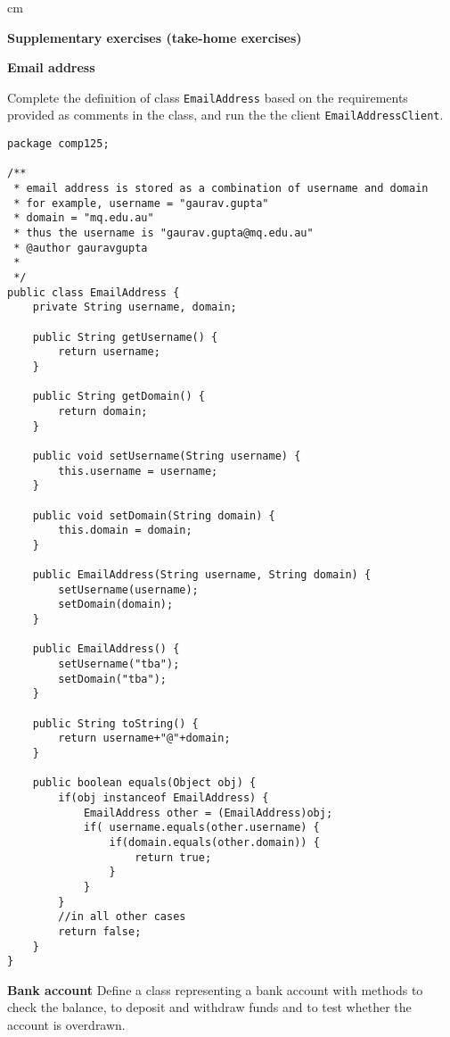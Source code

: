 \noindent\makebox[\linewidth]{\rule{\paperwidth}{0.4pt}}
 cm 

\begin{center}
\large
\textbf{Supplementary exercises (take-home exercises)}
\end{center}
\normalsize

\begin{questions}

\question  \textbf{Email address} \vskip 0.5cm

Complete the definition of class \texttt{EmailAddress} based on the requirements provided as comments in the class, and run the the client \texttt{EmailAddressClient}.

\begin{solution}
\begin{lstlisting}
package comp125;

/**
 * email address is stored as a combination of username and domain
 * for example, username = "gaurav.gupta"
 * domain = "mq.edu.au"
 * thus the username is "gaurav.gupta@mq.edu.au"
 * @author gauravgupta
 *
 */
public class EmailAddress {
	private String username, domain;

	public String getUsername() {
		return username;
	}

	public String getDomain() {
		return domain;
	}

	public void setUsername(String username) {
		this.username = username;
	}

	public void setDomain(String domain) {
		this.domain = domain;
	}

	public EmailAddress(String username, String domain) {
		setUsername(username);
		setDomain(domain);
	}
	
	public EmailAddress() {
		setUsername("tba");
		setDomain("tba");
	}

	public String toString() {
		return username+"@"+domain;
	}
	
	public boolean equals(Object obj) {
		if(obj instanceof EmailAddress) {
			EmailAddress other = (EmailAddress)obj;
			if( username.equals(other.username) {
				if(domain.equals(other.domain)) {
					return true;
				}
			}
		}
		//in all other cases
		return false;
	}
}
\end{lstlisting}
\end{solution}

\question  \textbf{Bank account} \vskip 0.5cm
Define a class representing a bank account with methods to check the balance, to deposit and withdraw funds and to test whether the account is overdrawn.


\end{questions}
